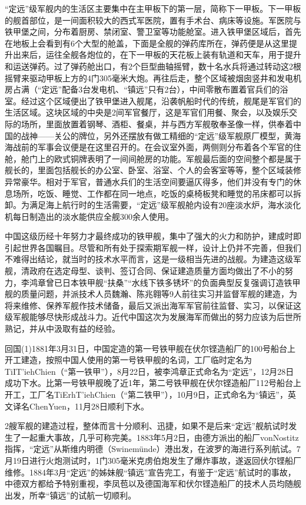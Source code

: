 \documentclass[12pt,UTF8]{ctexbook}
\begin{document}
“定远”级军舰内的生活区主要集中在主甲板下的第一层，简称下一甲板。下一甲板的舰首部位，是一间面积较大的西式军医院，置有手术台、病床等设施。军医院与铁甲堡之间，分布着厨房、禁闭室、警卫室等功能舱室。进入铁甲堡区域后，首先在地板上会看到有6个大型的舱盖，下面是全舰的弹药库所在，弹药便是从这里提升出来后，运往全舰各炮位的，在下一甲板的天花板上装有轨道和天车，用于提升和运送弹药。过了弹药舱出口，有2个巨型曲轴摇臂，数十名水兵将通过转动这2根摇臂来驱动甲板上方的4门305毫米大炮。再往后走，整个区域被烟囱竖井和发电机房占满（“定远”配备3台发电机、“镇远”只有2台），中间零散布置着官兵们的浴室。经过这个区域便出了铁甲堡进入舰尾，沿袭帆船时代的传统，舰尾是军官们的生活区域。这块区域的中央是2间军官餐厅，这是军官们用餐、聚会，以及娱乐交际的场所，里面放置着钢琴、酒柜、餐桌，并与西方军舰敬奉圣像一样，供奉着中国的战神——关公的牌位，另外还摆放有做工精细的“定远”级军舰原厂模型，黄海海战前的军事会议便是在这里召开的。在会议室外面，两侧则分布着各个军官的住舱，舱门上的欧式铜牌表明了一间间舱房的功能。军舰最后面的空间整个都是属于舰长的，里面包括舰长的办公室、卧室、浴室、个人的会客室等等，整个区域装修异常豪华。相对于军官，普通水兵们的生活空间要逼仄得多，他们并没有专门的休息场所，吃饭、睡觉、工作都在同一地点，吃饭的桌椅板凳和睡觉的吊床都可以拆卸。为满足海上航行时的生活需要，“定远”级军舰舱内设有20座淡水炉，海水淡化机每日制造出的淡水能供应全舰300余人使用。

中国这级历经十年努力才最终成功的铁甲舰，集中了强大的火力和防护，建成时即引起世界各国瞩目。尽管和所有处于探索期军舰一样，设计上仍并不完善，但我们不难得出结论，就当时的技术水平而言，这是一级相当先进的战舰。为建造这级军舰，清政府在选定母型、谈判、签订合同、保证建造质量方面均做出了不小的努力，李鸿章曾已日本铁甲舰“扶桑”“水线下铁多锈坏”的负面典型反复强调订造铁甲舰的质量问题，并派技术人员魏瀚、陈兆翱等9人前往实习并监督军舰的建造，为将来维修、保养军舰作技术储备，最后又派出海军军官前往监督、实习，以保证这级军舰能够尽快形成战斗力。近代中国这次为发展海军而做出的努力应该为后世所熟记，并从中汲取有益的经验。

回国(1)1881年3月31日，中国定造的第一号铁甲舰在伏尔铿造船厂的100号船台上开工建造，按照中国人使用的第一号铁甲舰的名词，工厂临时定名为TiIT’iehChien（“第一铁甲”），8月22日，被李鸿章正式命名为“定远”，12月28日成功下水。比第一号铁甲舰晚了近1年，第二号铁甲舰在伏尔铿造船厂112号船台上开工，工厂名TiErhT’iehChien（“第二铁甲”），10月9日，正式命名为“镇远”，英文译名ChenYuen，11月28日顺利下水。

2艘军舰的建造过程，整体而言十分顺利、迅捷，如果不是后来“定远”舰航试时发生了一起重大事故，几乎可称完美。1883年5月2日，由德方派出的船厂vonNostitz指挥，“定远”从斯维内明德（Swinemünde）港出发，在波罗的海进行系列航试。7月19日进行火炮测试时，1门305毫米克虏伯炮发生了爆炸事故，遂返回伏尔铿船厂维修。1884年3月“定远”的姊妹舰“镇远”宣告完工，有鉴于“定远”航试时的事故，中德双方都给予特别重视，李凤苞以及德国海军和伏尔铿造船厂的技术人员均随舰出发，所幸“镇远”的试航一切顺利。
\end{document}
